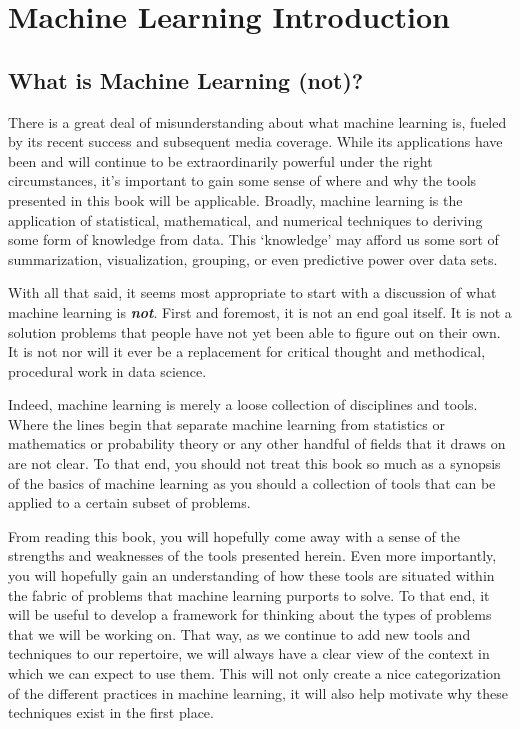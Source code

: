 \chapter{Machine Learning Introduction}

\section{What is Machine Learning (not)?}
There is a great deal of misunderstanding about what machine learning is, fueled by its recent success and subsequent media coverage. While its applications have been and will continue to be extraordinarily powerful under the right circumstances, it's important to gain some sense of where and why the tools presented in this book will be applicable. Broadly, machine learning is the application of statistical, mathematical, and numerical techniques to deriving some form of knowledge from data. This `knowledge' may afford us some sort of summarization, visualization, grouping, or even predictive power over data sets.

With all that said, it seems most appropriate to start with a discussion of what machine learning is \textbf{\textit{not}}. First and foremost, it is not an end goal itself. It is not a solution problems that people have not yet been able to figure out on their own. It is not nor will it ever be a replacement for critical thought and methodical, procedural work in data science.

Indeed, machine learning is merely a loose collection of disciplines and tools. Where the lines begin that separate machine learning from statistics or mathematics or probability theory or any other handful of fields that it draws on are not clear. To that end, you should not treat this book so much as a synopsis of the basics of machine learning as you should a collection of tools that can be applied to a certain subset of problems.

From reading this book, you will hopefully come away with a sense of the strengths and weaknesses of the tools presented herein. Even more importantly, you will hopefully gain an understanding of how these tools are situated within the fabric of problems that machine learning purports to solve. To that end, it will be useful to develop a framework for thinking about the types of problems that we will be working on. That way, as we continue to add new tools and techniques to our repertoire, we will always have a clear view of the context in which we can expect to use them. This will not only create a nice categorization of the different practices in machine learning, it will also help motivate why these techniques exist in the first place.

